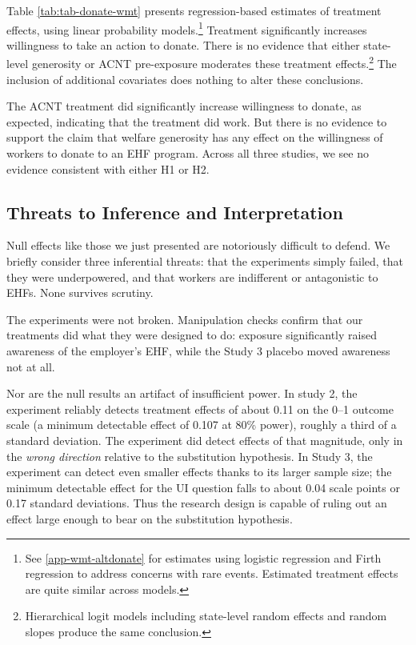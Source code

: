 \documentclass[
  11pt,
  oneside]{article}
\begin{document}
Table \ref{tab:tab-donate-wmt} presents regression-based estimates of treatment effects, using linear probability models.\footnote{See \ref{app-wmt-altdonate} for estimates using logistic regression and Firth regression to address concerns with rare events. Estimated treatment effects are quite similar across models.} Treatment significantly increases willingness to take an action to donate. There is no evidence that either state-level generosity or ACNT pre-exposure moderates these treatment effects.\footnote{Hierarchical logit models including state-level random effects and random slopes produce the same conclusion.} The inclusion of additional covariates does nothing to alter these conclusions.

The ACNT treatment did significantly increase willingness to donate, as expected, indicating that the treatment did work. But there is no evidence to support the claim that welfare generosity has any effect on the willingness of workers to donate to an EHF program. Across all three studies, we see no evidence consistent with either H1 or H2.

\subsection{Threats to Inference and Interpretation}\label{threats-to-inference-and-interpretation}

Null effects like those we just presented are notoriously difficult to defend. We briefly consider three inferential threats: that the experiments simply failed, that they were underpowered, and that workers are indifferent or antagonistic to EHFs. None survives scrutiny.

The experiments were not broken. Manipulation checks confirm that our treatments did what they were designed to do: exposure significantly raised awareness of the employer's EHF, while the Study 3 placebo moved awareness not at all.

Nor are the null results an artifact of insufficient power. In study 2, the experiment reliably detects treatment effects of about 0.11 on the 0--1 outcome scale (a minimum detectable effect of 0.107 at 80\% power), roughly a third of a standard deviation. The experiment did detect effects of that magnitude, only in the \emph{wrong direction} relative to the substitution hypothesis. In Study 3, the experiment can detect even smaller effects thanks to its larger sample size; the minimum detectable effect for the UI question falls to about 0.04 scale points or 0.17 standard deviations. Thus the research design is capable of ruling out an effect large enough to bear on the substitution hypothesis.
\end{document}
